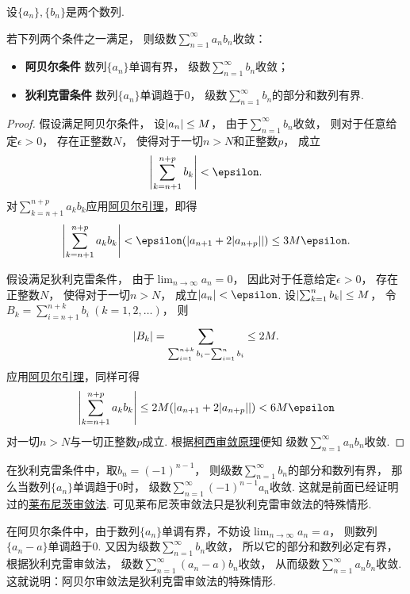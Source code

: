 \begin{theorem}\label{theorem:无穷级数.无穷级数的阿贝尔--狄利克雷审敛法}
设\(\{a_n\},\{b_n\}\)是两个数列.

若下列两个条件之一满足，
则级数\(\sum_{n=1}^\infty a_n b_n\)收敛：\begin{itemize}
	\item {\bf 阿贝尔条件}
	数列\(\{a_n\}\)单调有界，
	级数\(\sum_{n=1}^\infty b_n\)收敛；

	\item {\bf 狄利克雷条件}
	数列\(\{a_n\}\)单调趋于\(0\)，
	级数\(\sum_{n=1}^\infty b_n\)的部分和数列有界.
\end{itemize}
\begin{proof}
假设满足阿贝尔条件，
设\(\abs{a_n} \leq M\)，
由于\(\sum_{n=1}^\infty b_n\)收敛，
则对于任意给定\(\epsilon>0\)，
存在正整数\(N\)，
使得对于一切\(n>N\)和正整数\(p\)，
成立\[
	\abs{\sum_{k=n+1}^{n+p} b_k} < \epsilon.
\]
对\(\sum_{k=n+1}^{n+p} a_k b_k\)应用\hyperref[theorem:无穷级数.阿贝尔引理]{阿贝尔引理}，即得\[
	\abs{\sum_{k=n+1}^{n+p} a_k b_k}
	< \epsilon (\abs{a_{n+1} + 2 \abs{a_{n+p}}})
	\leq 3 M \epsilon.
\]

假设满足狄利克雷条件，
由于\(\lim_{n\to\infty} a_n = 0\)，
因此对于任意给定\(\epsilon>0\)，
存在正整数\(N\)，
使得对于一切\(n>N\)，
成立\(\abs{a_n} < \epsilon\).
设\(\abs{\sum_{k=1}^n b_k} \leq M\)，
令\(B_k = \sum_{i=n+1}^{n+k} b_i\ (k=1,2,\dotsc)\)，
则\[
	\abs{B_k}
	= \sum_{\sum_{i=1}^{n+k} b_i - \sum_{i=1}^n b_i}
	\leq 2 M.
\]
应用\hyperref[theorem:无穷级数.阿贝尔引理]{阿贝尔引理}，同样可得\[
	\abs{\sum_{k=n+1}^{n+p} a_k b_k}
	\leq 2 M (\abs{a_{n+1} + 2 \abs{a_{n+p}}})
	< 6 M \epsilon
\]对一切\(n>N\)与一切正整数\(p\)成立.
根据\hyperref[theorem:无穷级数.级数的柯西审敛原理]{柯西审敛原理}便知
级数\(\sum_{n=1}^\infty a_n b_n\)收敛.
\end{proof}
\end{theorem}
\begin{remark}
在狄利克雷条件中，取\(b_n = (-1)^{n-1}\)，
则级数\(\sum_{n=1}^\infty b_n\)的部分和数列有界，
那么当数列\(\{a_n\}\)单调趋于\(0\)时，
级数\(\sum_{n=1}^\infty (-1)^{n-1} a_n\)收敛.
这就是前面已经证明过的\hyperref[theorem:无穷级数.莱布尼茨定理]{莱布尼茨审敛法}.
可见莱布尼茨审敛法只是狄利克雷审敛法的特殊情形.

在阿贝尔条件中，由于数列\(\{a_n\}\)单调有界，不妨设\(\lim_{n\to\infty} a_n = a\)，
则数列\(\{a_n - a\}\)单调趋于\(0\).
又因为级数\(\sum_{n=1}^\infty b_n\)收敛，
所以它的部分和数列必定有界，根据狄利克雷审敛法，
级数\(\sum_{n=1}^\infty (a_n - a) b_n\)收敛，
从而级数\(\sum_{n=1}^\infty a_n b_n\)收敛.
这就说明：阿贝尔审敛法是狄利克雷审敛法的特殊情形.
\end{remark}
